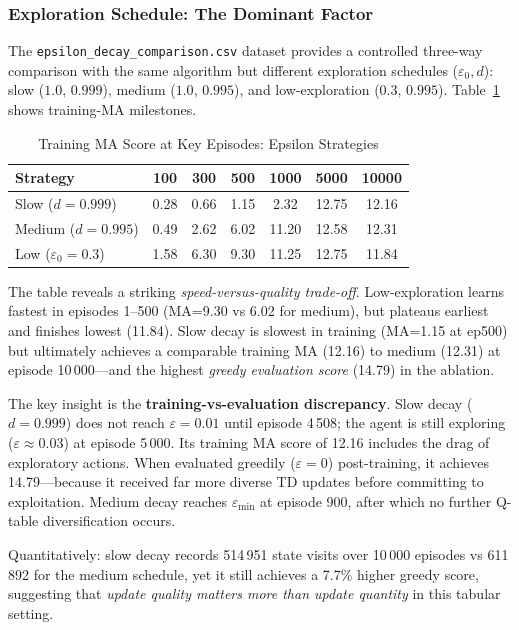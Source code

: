 \documentclass[10pt,conference]{IEEEtran}
\begin{document}
\subsubsection{Exploration Schedule: The Dominant Factor}

The \texttt{epsilon\_decay\_comparison.csv} dataset provides a
controlled three-way comparison with the same algorithm but
different exploration schedules
($\varepsilon_0,d$):
slow ($1.0,\,0.999$), medium ($1.0,\,0.995$), and
low-exploration ($0.3,\,0.995$).
Table~\ref{tab:epsdecay} shows training-MA milestones.

\begin{table}[h]
  \centering
  \caption{Training MA Score at Key Episodes: Epsilon Strategies}
  \label{tab:epsdecay}
  \begin{tabular}{lcccccc}
    \toprule
    Strategy & 100 & 300 & 500 & 1000 & 5000 & 10000 \\
    \midrule
    Slow ($d{=}0.999$)        & 0.28 & 0.66 & 1.15 & 2.32 & 12.75 & 12.16 \\
    Medium ($d{=}0.995$)      & 0.49 & 2.62 & 6.02 & 11.20 & 12.58 & 12.31 \\
    Low ($\varepsilon_0{=}0.3$) & 1.58 & 6.30 & 9.30 & 11.25 & 12.75 & 11.84 \\
    \bottomrule
  \end{tabular}
\end{table}

The table reveals a striking \emph{speed-versus-quality trade-off}.
Low-exploration learns fastest in episodes 1--500 (MA=9.30 vs 6.02
for medium), but plateaus earliest and finishes lowest (11.84).
Slow decay is slowest in training (MA=1.15 at ep500) but ultimately
achieves a comparable training MA (12.16) to medium (12.31) at
episode 10\,000---and the highest \emph{greedy evaluation score}
(14.79) in the ablation.

The key insight is the \textbf{training-vs-evaluation discrepancy}.
Slow decay ($d=0.999$) does not reach $\varepsilon=0.01$ until
episode 4\,508; the agent is still exploring ($\varepsilon\approx0.03$)
at episode 5\,000.
Its training MA score of 12.16 includes the drag of exploratory
actions.
When evaluated greedily ($\varepsilon=0$) post-training, it achieves
14.79---because it received far more diverse TD updates before
committing to exploitation.
Medium decay reaches $\varepsilon_{\min}$ at episode 900, after
which no further Q-table diversification occurs.

Quantitatively: slow decay records 514\,951 state visits over
10\,000 episodes vs 611\,892 for the medium schedule, yet it still
achieves a 7.7\% higher greedy score, suggesting that
\emph{update quality matters more than update quantity} in this
tabular setting.
\end{document}
